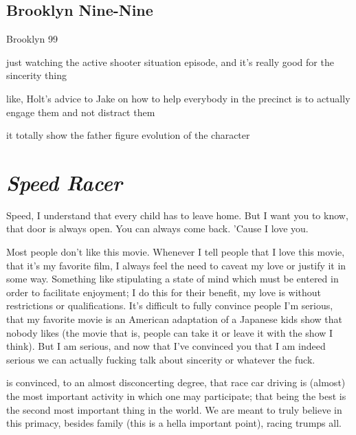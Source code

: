 \documentclass[../butidigress.tex]{subfiles}
\begin{document}
\subsection{Brooklyn Nine-Nine}

\begin{somenotes}{Brooklyn 99}
    \item just watching the active shooter situation episode, and it's really good for the sincerity thing
    \item like, Holt's advice to Jake on how to help everybody in the precinct is to actually engage them and not distract them
    \item it totally show the father figure evolution of the character
\end{somenotes}

\section{\textit{Speed Racer}}
\epigraph{Speed, I understand that every child has to leave home. But I want you to know, that door is always open. You can always come back. 'Cause I love you.}{}

Most people don't like this movie.
Whenever I tell people that I love this movie, that it's my favorite film, I always feel the need to caveat my love or justify it in some way.
Something like stipulating a state of mind which must be entered in order to facilitate enjoyment; I do this for their benefit, my love is without restrictions or qualifications.
It's difficult to fully convince people I'm serious, that my favorite movie is an American adaptation of a Japanese kids show that nobody likes (the movie that is, people can take it or leave it with the show I think).
But I am serious, and now that I've convinced you that I am indeed serious we can actually fucking talk about sincerity or whatever the fuck.

 is convinced, to an almost disconcerting degree, that race car driving is (almost) the most important activity in which one may participate; that being the best is the second most important thing in the world.
We are meant to truly believe in this primacy, besides family (this is a hella important point), racing trumps all.
\end{document}

